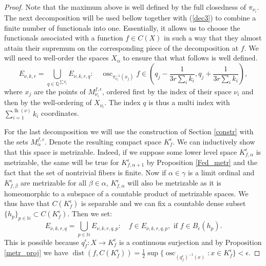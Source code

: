 \documentclass[10pt,a4paper]{amsart}
\newcommand{\N}{\mathbb{N}}
\newcommand{\Q}{\mathbb{Q}}
\DeclareMathOperator{\osc}{osc}
\DeclareMathOperator{\dist}{dist}
\DeclareMathOperator{\lgth}{lh}
\begin{document}
\begin{proof}
	Note that the maximum above is well defined by the full closedness of $\pi_{\nu_i}$. The next decomposition will be used bellow together with (\ref{dec3}) to combine a finite number of functionals into one. Essentially, it allows us to choose the functionals associated with a function $f \in C(X)$ in such a way that they almost attain their supremum on the corresponding piece of the decomposition at $f$. We will need to well-order the spaces $X_\alpha$ to ensure that what follows is well defined.
	\begin{equation}\label{dec4}
		E_{\nu, k, r} = \bigcup_{q \in \Q^{\sum k_i}} E_{\nu, k, r, q}: \quad \osc_{\pi_{\nu_i}^{-1}(x_j)} f \in \left(q_j - \frac{1}{3 r \sum_i k_i}, q_j + \frac{1}{3 r \sum_i k_i}\right),
	\end{equation}
	where $x_j$ are the points of $M^{f, \epsilon}_{\nu_i}$, ordered first by the index of their space $\nu_i$ and then by the well-ordering of $X_{\nu_i}$. The index $q$ is thus a multi index with $\sum_{i = 1}^{\lgth(\nu)} k_i$ coordinates.
	
	For the last decomposition we will use the construction of Section \ref{constr} with the sets $M^{f,\epsilon}_\alpha$. Denote the resulting compact space $K_f^\epsilon$. We can inductively show that this space is metrizable. Indeed, if we suppose some lower level space $K_{f, \alpha}^\epsilon$ is metrizable, the same will be true for $K_{f, \alpha +1}^\epsilon$ by Proposition \ref{Fed_metr} and the fact that the set of nontrivial fibers is finite. Now if $\alpha \in \gamma$ is a limit ordinal and $K_{f, \beta}^\epsilon$ are metrizable for all $\beta \in \alpha$, $K_{f, \alpha}^\epsilon$ will also be metrizable as it is homeomorphic to a subspace of a countable product of metrizable spaces. We thus have that $C(K_f^\epsilon)$ is separable and we can fix a countable dense subset $\{h_p\}_{p \in \N} \subset C(K_f^\epsilon)$. Then we set:
	\begin{equation}\label{dec5}
		E_{\nu, k, r, q} = \bigcup_{p \in \N} E_{\nu, k, r, q, p}: \quad  f \in E_{\nu, k, r, q,p}, \text{ if } f \in B_{\epsilon}(h_p).
	\end{equation}
	This is possible because $q^\epsilon_f: X \to K^\epsilon_f$ is a continuous surjection and by Proposition \ref{metr_proj} we have $\dist(f, C(K^\epsilon_f)) = \frac{1}{2} \sup\{\osc_{(q^\epsilon_f)^{-1}(x)}: x \in K^\epsilon_f\} < \epsilon$.
	

\end{proof}
\end{document}
